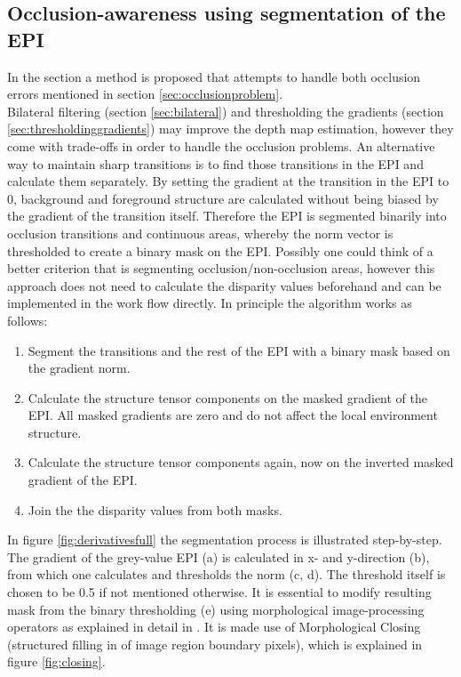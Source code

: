 \documentclass  [
  paper    = a4,
  BCOR     = 10mm,
  twoside,
  fontsize = 12pt,
  fleqn,
  toc      = bibnumbered,
  toc      = listofnumbered,
  numbers  = noendperiod,
  headings = normal,
  listof   = leveldown,
  version  = 3.03
]                                       {scrreprt}
\begin{document}
 \subsection{Occlusion-awareness using segmentation of the EPI}
 \label{sec:occlusionsegmentation}
 In the section a method is proposed that attempts to handle both occlusion errors mentioned in section \ref{sec:occlusionproblem}.\\
 Bilateral filtering (section \ref{sec:bilateral}) and thresholding the gradients (section \ref{sec:thresholdinggradients}) may improve the depth map estimation, however they come with trade-offs in order to handle the occlusion problems. An alternative way to maintain sharp transitions is to find those transitions in the EPI and calculate them separately. By setting the gradient at the transition in the EPI to 0, background and foreground structure are calculated without being biased by the gradient of the transition itself. Therefore the EPI is segmented binarily into occlusion transitions and continuous areas, whereby the norm vector is thresholded to create a binary mask on the EPI. Possibly one could think of a better criterion that is segmenting occlusion/non-occlusion areas, however this approach does not need to calculate the disparity values beforehand and can be implemented in the work flow directly. In principle the algorithm works as follows:
 \begin{enumerate}
 	\item Segment the transitions and the rest of the EPI with a binary mask based on the gradient norm.
 	\item Calculate the structure tensor components on the masked gradient of the EPI. All masked gradients are zero and do not affect the local environment structure.
 	\item Calculate the structure tensor components again, now on the inverted masked gradient of the EPI.
 	\item Join the the disparity values from both masks.
 \end{enumerate}
 In figure \ref{fig:derivativesfull} the segmentation process is illustrated step-by-step. The gradient of the grey-value EPI (a) is calculated in x- and y-direction (b), from which one calculates and thresholds the norm (c, d). The threshold itself is chosen to be 0.5 if not mentioned otherwise. It is essential to modify resulting mask from the binary thresholding (e)  using morphological image-processing operators as explained in detail in \cite{homepages.inf.ed.ac.uk}. It is made use of Morphological Closing (structured filling in of image region boundary pixels), which is explained in figure \ref{fig:closing}.\\
\end{document}
